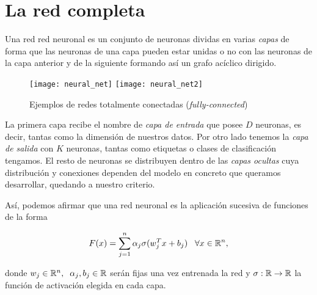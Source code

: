 \section{La red completa}

Una red red neuronal es un conjunto de neuronas dividas en varias \emph{capas} de forma que las neuronas de una capa pueden estar unidas o no con las neuronas de la capa anterior y de la siguiente formando así un grafo acíclico dirigido.\newline

\begin{figure}[htpb]
  \centering
  \texttt{[image: neural\_net]}
  \vrule
  \texttt{[image: neural\_net2]}
  \caption{Ejemplos de redes totalmente conectadas (\emph{fully-connected}) \stanford }
  \label{fig:fully-connected}
\end{figure}

La primera capa recibe el nombre de \emph{capa de entrada} que posee $D$ neuronas, es decir, tantas como la dimensión de nuestros datos. Por otro lado tenemos la \emph{capa de salida} con $K$ neuronas, tantas como etiquetas o clases de clasificación tengamos. El resto de neuronas se distribuyen dentro de las \emph{capas ocultas} cuya distribución y conexiones dependen del modelo en concreto que queramos desarrollar, quedando a nuestro criterio.\newline


Así, podemos afirmar que una red neuronal es la aplicación sucesiva de funciones de la forma

$$F(x)=\sum_{j=1}^n \alpha_j \sigma(w_j^Tx+b_j) \;\;\; \forall x \in \mathbb{R}^n,$$

donde $w_j\in\mathbb{R}^n,\;\; \alpha_j,b_j\in\mathbb{R}$ serán fijas una vez entrenada la red y $\sigma : \mathbb{R} \to \mathbb{R}$ la función de activación elegida en cada capa.\\

